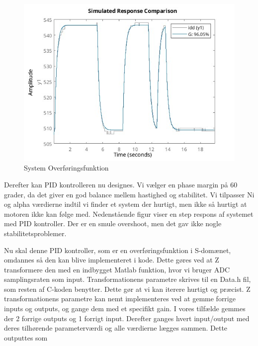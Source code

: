 \documentclass[../main.tex]{subfiles}
\begin{document}
\begin{figure}[H]
      \includegraphics[width=\textwidth]{Dokumentation/Motor Model Fit.jpg}
     \caption{System Overføringsfunktion}
     \label{fig: System Overføringsfunktion}
     \end{figure}

Derefter kan PID kontrolleren nu designes. Vi vælger en phase margin på 60 grader, da det giver en god balance mellem hastighed og stabilitet. Vi tilpasser Ni og alpha værdierne indtil vi finder et system der hurtigt, men ikke så hurtigt at motoren ikke kan følge med. Nedenstående figur viser en step respons af systemet med PID kontroller. Der er en smule overshoot, men det gav ikke nogle stabilitetsproblemer.

Nu skal denne PID kontroller, som er en overføringsfunktion i S-domænet, omdannes så den kan blive implementeret i kode. Dette gøres ved at Z transformere den med en indbygget Matlab funktion, hvor vi bruger ADC samplingsraten som input. Transformationens parametre skrives til en Data.h fil, som resten af C-koden benytter. Dette gør at vi kan iterere hurtigt og præcist. Z transformationens parametre kan nemt implementeres ved at gemme forrige inputs og outputs, og gange dem med et specifikt gain. I vores tilfælde gemmes der 2 forrige outputs og 1 forrigt input. Derefter ganges hvert input/output med deres tilhørende parameterværdi og alle værdierne lægges sammen. Dette outputtes som 

     
\end{document}
